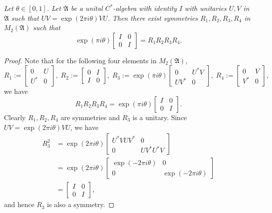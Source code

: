 \documentclass[10pt,a4paper]{amsart}
\newcommand{\fA}{\mathfrak A}     \newcommand{\sA}{\mathcal A}
\begin{document}
\begin{prop}
\label{prop:univ_Cstar_symprod}
\textsl{
Let $\theta \in [0, 1]$. Let $\mathfrak{A}$ be a unital $C^*$-algebra with identity $I$ with unitaries $U, V$ in $\fA$ such that $UV = \exp(2 \pi i \theta) VU$. Then there exist symmetries $R_1, R_2, R_3, R_4$ in $M_2(\mathfrak{A})$ such that $$\exp(\pi i \theta) \begin{bmatrix}
I & 0 \\
0 & I
\end{bmatrix} = R_1 R_2 R_3 R_4.$$
}
\end{prop}

\begin{proof}
Note that for the following four elements in $M_2(\fA)$,
$$R_1 := \begin{bmatrix}
0 & U\\
U^* & 0
\end{bmatrix},\; R_2 := \begin{bmatrix}
0 & I\\
I & 0
\end{bmatrix},\; R_3 := \exp(\pi i \theta) \begin{bmatrix}
0 & U^* V \\
UV^* & 0
\end{bmatrix},\; R_4 := \begin{bmatrix}
0 & V\\
V^* & 0
\end{bmatrix},$$ we have $$R_1 R_2 R_3 R_4 = \exp(\pi i \theta)
\begin{bmatrix}
I & 0\\
0 & I
\end{bmatrix}.$$ Clearly $R_1, R_2, R_4$ are symmetries and $R_3$ is a unitary. Since $UV = \exp(2 \pi i \theta) VU$, we have
 \begin{align*}
     R_3 ^2 &= \exp(2 \pi i \theta) \begin{bmatrix}
     U^*VUV^* & 0\\
     0 & UV^*U^*V
     \end{bmatrix}\\
     &= \exp(2 \pi i \theta) 
    \begin{bmatrix}
    \exp(-2 \pi i \theta) & 0\\
    0 & \exp(-2 \pi i \theta)
    \end{bmatrix}\\
    & = \begin{bmatrix}
    I & 0\\
    0 & I
    \end{bmatrix},
\end{align*}
and hence $R_3$ is also a symmetry.
\end{proof}
\end{document}
